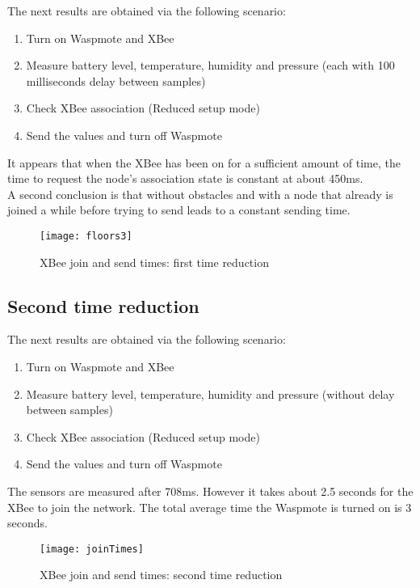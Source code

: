 The next results are obtained via the following scenario:\\

\begin{enumerate}
\item Turn on Waspmote and XBee
\item Measure battery level, temperature, humidity and pressure (each with 100 milliseconds delay between samples)
\item Check XBee association (Reduced setup mode)
\item Send the values and turn off Waspmote
\end{enumerate}
\vspace{1cm}
\noindent
It appears that when the XBee has been on for a sufficient amount of time, the time to request the node's association state is constant at about 450ms.\\
A second conclusion is that without obstacles and with a node that already is joined a while before trying to send leads to a constant sending time.\\  \bigskip \bigskip
\hspace{5cm}
\begin{figure}[htbp]
\centering
\texttt{[image: floors3]}
\caption[XBee join and send times: first time reduction]{XBee join and send times: first time reduction}
\label{fig:floors3}
\end{figure}
\vfill
\pagebreak
\subsection{Second time reduction}
\label{second}
The next results are obtained via the following scenario:\\

\begin{enumerate}
\item Turn on Waspmote and XBee
\item Measure battery level, temperature, humidity and pressure (without delay between samples)
\item Check XBee association (Reduced setup mode)
\item Send the values and turn off Waspmote
\end{enumerate}
\vspace{1cm}
\noindent
The sensors are measured after 708ms. However it takes about 2.5 seconds for the XBee to join the network. The total average time the Waspmote is turned on is 3 seconds.
\begin{figure}[htbp]
\centering
\texttt{[image: joinTimes]}
\caption[XBee join and send times: second time reduction]{XBee join and send times: second time reduction}
\label{fig:joinTimes}
\end{figure} 
\vfill
\pagebreak
